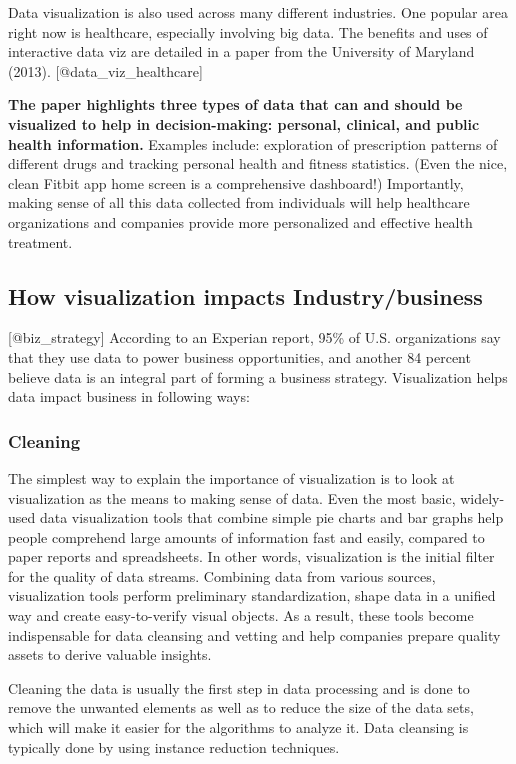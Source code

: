 \documentclass[]{book}
\theoremstyle{definition}
\theoremstyle{definition}
\theoremstyle{definition}
\theoremstyle{remark}
\begin{document}
Data visualization is also used across many different industries. One
popular area right now is healthcare, especially involving big data. The
benefits and uses of interactive data viz are detailed in a paper from
the University of Maryland (2013). {[}@data\_viz\_healthcare{]}

\textbf{The paper highlights three types of data that can and should be
visualized to help in decision-making: personal, clinical, and public
health information.} Examples include: exploration of prescription
patterns of different drugs and tracking personal health and fitness
statistics. (Even the nice, clean Fitbit app home screen is a
comprehensive dashboard!) Importantly, making sense of all this data
collected from individuals will help healthcare organizations and
companies provide more personalized and effective health treatment.

\subsection{How visualization impacts
Industry/business}\label{how-visualization-impacts-industrybusiness}

{[}@biz\_strategy{]} According to an Experian report, 95\% of U.S.
organizations say that they use data to power business opportunities,
and another 84 percent believe data is an integral part of forming a
business strategy. Visualization helps data impact business in following
ways:

\subsubsection{Cleaning}\label{cleaning}

The simplest way to explain the importance of visualization is to look
at visualization as the means to making sense of data. Even the most
basic, widely-used data visualization tools that combine simple pie
charts and bar graphs help people comprehend large amounts of
information fast and easily, compared to paper reports and spreadsheets.
In other words, visualization is the initial filter for the quality of
data streams. Combining data from various sources, visualization tools
perform preliminary standardization, shape data in a unified way and
create easy-to-verify visual objects. As a result, these tools become
indispensable for data cleansing and vetting and help companies prepare
quality assets to derive valuable insights.

Cleaning the data is usually the first step in data processing and is
done to remove the unwanted elements as well as to reduce the size of
the data sets, which will make it easier for the algorithms to analyze
it. Data cleansing is typically done by using instance reduction
techniques.
\end{document}
